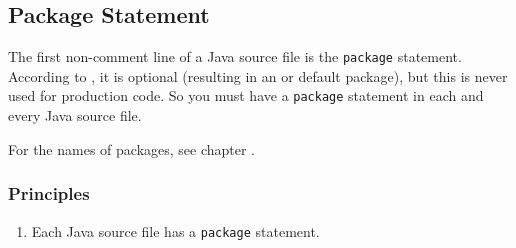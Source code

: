 \subsection{Package Statement}\label{sec:PackageStatement}
The first non-comment line of a Java source file is the \lstinline|package| statement. According to \jls \autocite{ORACLE_DOC_LANGUAGE_SPECIFICATION:UnnamedPackages}, it is optional (resulting in an  or default package), but this is never used for production code. So you must have a \lstinline|package| statement in each and every Java source file.

For the names of packages, see chapter .

\subsubsection{Principles}
\begin{enumerate}[label=P\arabic*.]
\item{Each Java source file has a \lstinline|package| statement.}
\end{enumerate}

